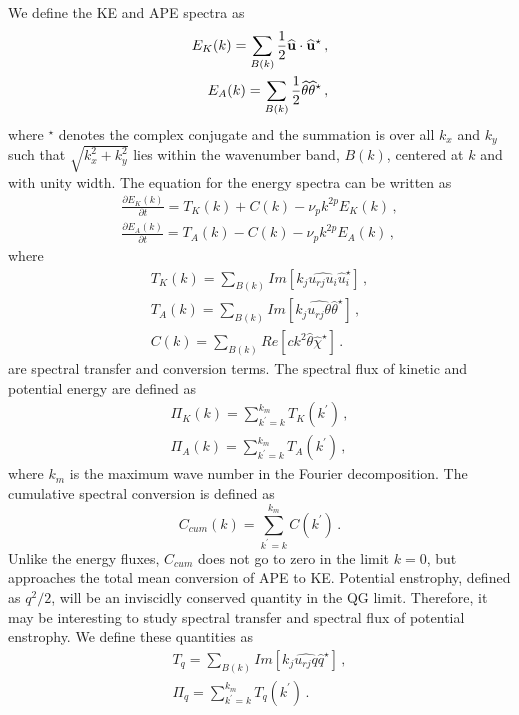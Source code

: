 We define the KE and APE spectra as
\begin{eqnarray}
E_K(k) =\sum_{B(k)}  \frac{1}{2}  \widehat{\bf u} \cdot \widehat{\bf u}^{\star}  \, , \\
E_A(k) = \sum_{B(k)} \frac{1}{2} \widehat{\theta} \widehat{\theta}^{\star} \, ,
\end{eqnarray}
where $ ^{\star} $ denotes the complex conjugate and the summation is over
all $ k_x $ and $ k_y $ such that $ \sqrt{k_x^2+k_y^{2}} $ lies within the wavenumber band,  $ B(k) $,   centered at $ k $ and with unity width. The equation for the energy spectra can be written as
\begin{eqnarray}
\frac{\partial{E_K}(k)} {\partial t}  = T_K(k) + C (k) - \nu_p k^{2p} E_K(k) \, , \\
\frac{\partial{E_A}(k)} {\partial t}  = T_A(k) - C (k) - \nu_p k^{2p} E_A(k) \, ,
\end{eqnarray}
where
\begin{eqnarray}
T_{K}(k) = \sum_{B(k)} Im [  k_j \widehat{u_{rj} u_i} \widehat{u}_i ^{\star} ]  \, , \\
T_{A}(k)  = \sum_{B(k)} Im [ k_j \widehat{u_{rj} \theta} \widehat{\theta} ^{\star}] \, , \\
C (k) = \sum_{B(k)} Re[ c k^{2}\widehat{\theta} \widehat{\chi}^{\star}] \, .
\end{eqnarray}
are spectral transfer and conversion terms. The spectral flux of kinetic and potential energy are defined as
\begin{eqnarray}
\Pi_K(k) = \sum_{k^{\prime} = k}^{k_{m}} T_K(k^{\prime}) \, , \\
\Pi_A(k) = \sum_{k^{\prime} = k}^{k_{m}} T_A(k^{\prime}) \, ,
\end{eqnarray}
where $ k_{m} $ is the maximum wave number in the Fourier decomposition. The cumulative spectral conversion is defined as
\begin{equation} \label{Cum}
C_{cum} (k)  = \sum_{k^{\prime} = k}^{k_{m}} C (k^{\prime}) \, .
\end{equation}
Unlike the energy fluxes, $ C_{cum} $ does not go to zero in the limit $ k =0 $, but approaches the total mean conversion of APE to KE.
Potential enstrophy,  defined as $ q^2/2 $,  will be an inviscidly conserved quantity in the QG limit. Therefore, it may be interesting to study spectral transfer and spectral flux of potential enstrophy. We define these quantities as
\begin{eqnarray}
T_{q} =  \sum_{B(k)} Im [ k_j \widehat{u_{rj} q} \widehat{q}^{\star}]  \, , \\
\Pi_{q} = \sum_{k^{\prime} = k}^{k_{m}} T_{q} (k^{\prime}) \, .
\end{eqnarray}
